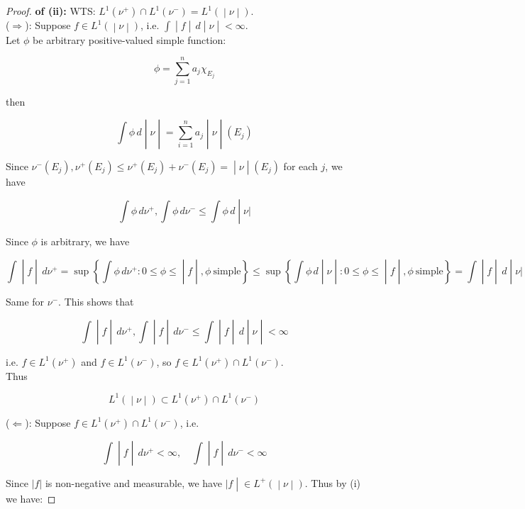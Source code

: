 \documentclass{qlnotes-export}
\begin{document}
\begin{proof}

\textbf{of (ii):} WTS: \(\left. L^{1}(\nu^{+}) \cap L^{1}(\nu^{-}) = L^{1}( \middle| \nu \middle| ) \right.\).\\
(\(\Rightarrow\)): Suppose \(\left. f \in L^{1}( \middle| \nu \middle| ) \right.\), i.e. \(\left. \int \middle| f \middle| \, d \middle| \nu \middle| < \infty \right.\).\\
Let \(\phi\) be arbitrary positive-valued simple function:

\[\phi = \sum\limits_{j = 1}^{n}a_{j}\chi_{E_{j}}\]

then

\[\left. \int\phi\, d \middle| \nu \middle| = \sum\limits_{i = 1}^{n}a_{j} \middle| \nu \middle| (E_{j}) \right.\]

Since \(\left. \nu^{-}(E_{j}),\nu^{+}(E_{j}) \leq \nu^{+}(E_{j}) + \nu^{-}(E_{j}) = \middle| \nu \middle| (E_{j}) \right.\) for each \(j\), we have

\[\left. \int\phi\, d\nu^{+},\int\phi\, d\nu^{-} \leq \int\phi\, d \middle| \nu| \right.\]

Since \(\phi\) is arbitrary, we have

\[\left. \int \middle| f \middle| \, d\nu^{+} = \sup\left\{ \int\phi\, d\nu^{+}:0 \leq \phi \leq \middle| f \middle| ,\phi\ \text{simple} \right\} \leq \sup\left\{ \int\phi\, d \middle| \nu \middle| :0 \leq \phi \leq \middle| f \middle| ,\phi\ \text{simple} \right\} = \int \middle| f \middle| \, d \middle| \nu| \right.\]

Same for \(\nu^{-}\). This shows that

\[\left. \int \middle| f \middle| \, d\nu^{+},\int \middle| f \middle| \, d\nu^{-} \leq \int \middle| f \middle| \, d \middle| \nu \middle| < \infty \right.\]

i.e. \(f \in L^{1}(\nu^{+})\) and \(f \in L^{1}(\nu^{-})\), so \(f \in L^{1}(\nu^{+}) \cap L^{1}(\nu^{-})\).\\
Thus

\[\left. L^{1}( \middle| \nu \middle| ) \subset L^{1}(\nu^{+}) \cap L^{1}(\nu^{-}) \right.\]

(\(\Leftarrow\)): Suppose \(f \in L^{1}(\nu^{+}) \cap L^{1}(\nu^{-})\), i.e.

\[\left. \int \middle| f \middle| \, d\nu^{+} < \infty,\quad\int \middle| f \middle| \, d\nu^{-} < \infty \right.\]

Since \(|f|\) is non-negative and measurable, we have \(\left. |f \middle| \in L^{+}( \middle| \nu \middle| ) \right.\). Thus by (i) we have:


\end{proof}
\end{document}
